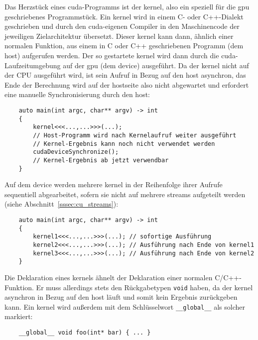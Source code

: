 Das Herzstück eines \gls{cuda}-Programms ist der \gls{kernel}, also ein speziell für die \gls{gpu} geschriebenes
Programmstück. Ein \gls{kernel} wird in einem C- oder C++-Dialekt geschrieben und durch den \gls{cuda}-eigenen Compiler
in den Maschinencode der jeweiligen Zielarchitektur übersetzt. Dieser \gls{kernel} kann dann, ähnlich einer normalen
Funktion, aus einem in C oder C++ geschriebenen Programm (dem \gls{host}) aufgerufen werden. Der so gestartete
\gls{kernel} wird dann durch die \gls{cuda}-Laufzeitumgebung auf der \gls{gpu} (dem \gls{device}) ausgeführt. Da der
\gls{kernel} nicht auf der CPU ausgeführt wird, ist sein Aufruf in Bezug auf den \gls{host} asynchron, das Ende der
Berechnung wird auf der \gls{host}seite also nicht abgewartet und erfordert eine manuelle Synchronisierung durch den
\gls{host}:

\begin{verbatim}
    auto main(int argc, char** argv) -> int
    {
        kernel<<<...,...>>>(...);
        // Host-Programm wird nach Kernelaufruf weiter ausgeführt
        // Kernel-Ergebnis kann noch nicht verwendet werden
        cudaDeviceSynchronize();
        // Kernel-Ergebnis ab jetzt verwendbar
    }
\end{verbatim}

Auf dem \gls{device} werden mehrere \gls{kernel} in der Reihenfolge ihrer Aufrufe sequentiell abgearbeitet,
sofern sie nicht auf mehrere \glspl{stream} aufgeteilt werden (siehe Abschnitt~\ref{sssec:cu_streams}):

\begin{verbatim}
    auto main(int argc, char** argv) -> int
    {
        kernel1<<<...,...>>>(...); // sofortige Ausführung
        kernel2<<<...,...>>>(...); // Ausführung nach Ende von kernel1
        kernel3<<<...,...>>>(...); // Ausführung nach Ende von kernel2
    }
\end{verbatim}

Die Deklaration eines \gls{kernel}s ähnelt der Deklaration einer normalen C/C++-Funktion. Er muss allerdings stets
den Rückgabetypen \texttt{void} haben, da der \gls{kernel} asynchron in Bezug auf den \gls{host} läuft und somit kein
Ergebnis zurückgeben kann. Ein \gls{kernel} wird außerdem mit dem Schlüsselwort \texttt{\_\_global\_\_} als solcher
markiert:

\begin{verbatim}
    __global__ void foo(int* bar) { ... }
\end{verbatim}

